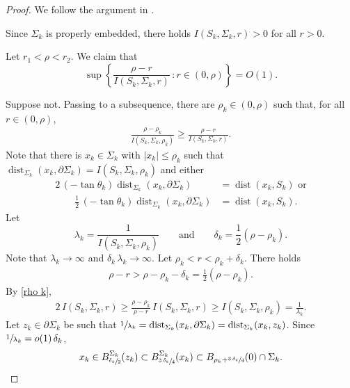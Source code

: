 \documentclass[11pt]{amsart}
\begin{document}
\begin{proof}
	We follow the argument in \cite[Lemma 4.13]{chodoshedelenli}.
	

Since $\Sigma_k$ is properly embedded, there holds $I(S_k,\Sigma_k,r)>0$ for all $r>0$.
	
Let $r_1<\rho<r_2$. We claim that 
$$
\sup\left\{\frac{\rho-r}{I(S_k,\Sigma_k,r)}\,:r\in(0,\rho)\right\}=O(1).
$$

Suppose not. Passing to a subsequence, there are  $\rho_k\in(0,\rho)$ such that, for all $r\in(0,\rho)$, 
\begin{align} \label{rho k}
\frac{\rho-\rho_k}{I(S_k,\Sigma_k,\rho_k)}\geq \frac{\rho-r}{I(S_k,\Sigma_k,r)}.
\end{align}
Note that there is $x_k\in\Sigma_k$ with $|x_k|\leq \rho_k$  such that $\operatorname{dist}_{\Sigma_k}(x_k, \partial \Sigma_k)=I(S_k,\Sigma_k,\rho_k)$ and either
\begin{equation} \label{distance} 
\begin{aligned} 
2\,(-\tan\theta_k)\operatorname{dist}_{\Sigma_k}(x_k, \partial {\Sigma_k})&=\operatorname{dist}(x_k,S_k)\text{ or}\\
\qquad \frac12\,(-\tan\theta_k)	\operatorname{dist}_{\Sigma_k}(x_k, \partial {\Sigma_k})&=\operatorname{dist}(x_k,S_k).
\end{aligned} 
\end{equation} 
Let $$\lambda_k=\frac{1}{I(S_k,\Sigma_k,\rho_k)}\qquad\text{and}\qquad\delta_k=\frac12\left(\rho-\rho_k\right).$$ Note that $\lambda_k\to\infty$ and $\delta_k\,\lambda_k\to\infty$.  Let $\rho_k<r<\rho_k+\delta_k$. There holds
\begin{align*} 
\rho-r> \rho-\rho_k-\delta_k= \frac{1}{2}\left(\rho-\rho_k\right).
\end{align*} 
By \eqref{rho k},
\begin{align} \label{estimate 2} 
	2\,I(S_k,\Sigma_k,r)\geq\frac{\rho-\rho_k}{\rho-r}\,I(S_k,\Sigma_k,r)\geq I(S_k,\Sigma_k,\rho_k)= \frac1{\lambda_k}. 
\end{align} 
Let $z_k\in \partial \Sigma_k$ be such that $\sfrac1{\lambda_k}=\operatorname{dist}_{\Sigma_k}(x_k,\partial \Sigma_k)=\operatorname{dist}_{\Sigma_k}(x_k,z_k)$. Since $\sfrac1{\lambda_k}=o(1)\,\delta_k$, 
$$x_k\in B^{\Sigma_k}_{\sfrac{\delta_k}{2}}(z_k)\subset B^{\Sigma_k}_{\sfrac{3\,\delta_k}{4}}(x_k)\subset B_{\rho_k+\sfrac{3\,\delta_k}4}(0)\cap \Sigma_k.$$  


\end{proof}
\end{document}
